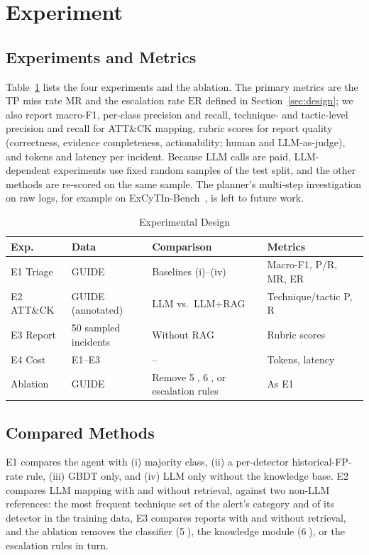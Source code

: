 \documentclass[conference]{IEEEtran}
\begin{document}
\section{Experiment}\label{sec:exp}

\subsection{Experiments and Metrics}
Table~\ref{tab:exp} lists the four experiments and the ablation. The
primary metrics are the TP miss rate $\mathrm{MR}$ and the escalation
rate $\mathrm{ER}$ defined in Section~\ref{sec:design}; we also report
macro-F1, per-class precision and recall, technique- and tactic-level
precision and recall for ATT\&CK mapping, rubric scores for report
quality (correctness, evidence completeness, actionability; human and
LLM-as-judge), and tokens and latency per incident. Because LLM calls
are paid, LLM-dependent experiments use fixed random samples of the
test split, and the other methods are re-scored on the same sample.
The planner's multi-step investigation on raw logs, for example on
ExCyTIn-Bench~\cite{wu2025excytin}, is left to future work.

\begin{table}[t]
\caption{Experimental Design}
\label{tab:exp}
\centering
\footnotesize
\setlength{\tabcolsep}{2.5pt}
\begin{tabular}{@{}p{1.3cm}p{1.6cm}p{2.2cm}p{2.6cm}@{}}
\toprule
\textbf{Exp.} & \textbf{Data} & \textbf{Comparison} & \textbf{Metrics} \\
\midrule
E1 Triage & GUIDE & Baselines (i)--(iv) & Macro-F1, P/R, MR, ER \\
E2 ATT\&CK & GUIDE (annotated) & LLM vs.\ LLM+RAG & Technique/tactic P, R \\
E3 Report & 50 sampled incidents & Without RAG & Rubric scores \\
E4 Cost & E1--E3 & -- & Tokens, latency \\
Ablation & GUIDE & Remove \textcircled{5}, \textcircled{6}, or escalation rules & As E1 \\
\bottomrule
\end{tabular}
\end{table}

\subsection{Compared Methods}
E1 compares the agent with (i) majority class, (ii) a per-detector
historical-FP-rate rule, (iii) GBDT only, and (iv) LLM only without the
knowledge base. E2 compares LLM mapping with and without retrieval,
against two non-LLM references: the most frequent technique set of the
alert's category and of its detector in the training data, E3
compares reports with and without retrieval, and the ablation removes
the classifier
(\textcircled{5}), the knowledge module (\textcircled{6}), or the
escalation rules in turn.
\end{document}
